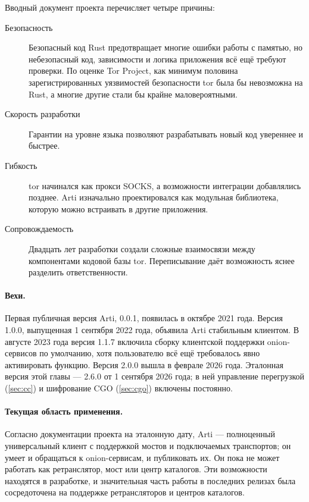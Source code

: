 Вводный документ проекта перечисляет четыре причины:
\begin{description}
  \item[Безопасность] Безопасный код Rust предотвращает многие ошибки работы с памятью, но небезопасный код, зависимости и логика приложения всё ещё требуют проверки. По оценке Tor Project, как минимум половина зарегистрированных уязвимостей безопасности tor была бы невозможна на Rust, а многие другие стали бы крайне маловероятными.
  \item[Скорость разработки] Гарантии на уровне языка позволяют разрабатывать новый код увереннее и быстрее.
  \item[Гибкость] tor начинался как прокси SOCKS, а возможности интеграции добавлялись позднее. Arti изначально проектировался как модульная библиотека, которую можно встраивать в другие приложения.
  \item[Сопровождаемость] Двадцать лет разработки создали сложные взаимосвязи между компонентами кодовой базы tor. Переписывание даёт возможность яснее разделить ответственности.
\end{description}

\paragraph{Вехи.} Первая публичная версия Arti, 0.0.1, появилась в октябре 2021 года. Версия 1.0.0, выпущенная 1 сентября 2022 года, объявила Arti стабильным клиентом. В августе 2023 года версия 1.1.7 включила сборку клиентской поддержки onion-сервисов по умолчанию, хотя пользователю всё ещё требовалось явно активировать функцию. Версия 2.0.0 вышла в феврале 2026 года. Эталонная версия этой главы — 2.6.0 от 1 сентября 2026 года; в ней управление перегрузкой (\cref{sec:cc}) и шифрование CGO (\cref{sec:cgo}) включены постоянно.

\paragraph{Текущая область применения.} Согласно документации проекта на эталонную дату, Arti — полноценный универсальный клиент с поддержкой мостов и подключаемых транспортов; он умеет и обращаться к onion-сервисам, и публиковать их. Он пока не может работать как ретранслятор, мост или центр каталогов. Эти возможности находятся в разработке, и значительная часть работы в последних релизах была сосредоточена на поддержке ретрансляторов и центров каталогов.


